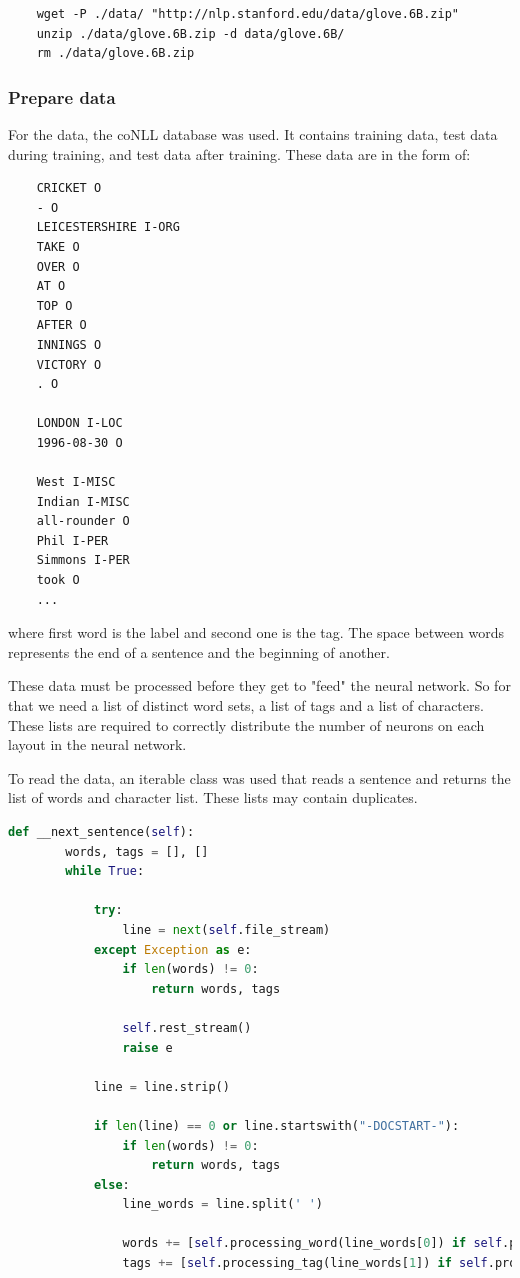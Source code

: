 \begin{lstlisting}
    wget -P ./data/ "http://nlp.stanford.edu/data/glove.6B.zip"
    unzip ./data/glove.6B.zip -d data/glove.6B/
    rm ./data/glove.6B.zip
\end{lstlisting}


\subsubsection{Prepare data}

For the data, the coNLL database was used. It contains training data, test data during training, and test data after training. These data are in the form of:

\begin{lstlisting}
    CRICKET O
    - O
    LEICESTERSHIRE I-ORG
    TAKE O
    OVER O
    AT O
    TOP O
    AFTER O
    INNINGS O
    VICTORY O
    . O
    
    LONDON I-LOC
    1996-08-30 O
    
    West I-MISC
    Indian I-MISC
    all-rounder O
    Phil I-PER
    Simmons I-PER
    took O
    ...
\end{lstlisting}

where first word is the label and second one is the tag. The space between words represents the end of a sentence and the beginning of another.

These data must be processed before they get to "feed" the neural network. So for that we need a list of distinct word sets, a list of tags and a list of characters. These lists are required to correctly distribute the number of neurons on each layout in the neural network.

To read the data, an iterable class was used that reads a sentence and returns the list of words and character list. These lists may contain duplicates.

\begin{lstlisting}[language=Python,caption={Read data}]
    def __next_sentence(self):
        words, tags = [], []
        while True:

            try:
                line = next(self.file_stream)
            except Exception as e:
                if len(words) != 0:
                    return words, tags

                self.rest_stream()
                raise e

            line = line.strip()

            if len(line) == 0 or line.startswith("-DOCSTART-"):
                if len(words) != 0:
                    return words, tags
            else:
                line_words = line.split(' ')

                words += [self.processing_word(line_words[0]) if self.processing_word is not None else line_words[0]]
                tags += [self.processing_tag(line_words[1]) if self.processing_tag is not None else line_words[1]]
\end{lstlisting}

